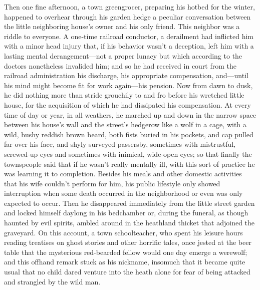 \documentclass[12pt,a4paper]{article}
\begin{document}
Then one fine afternoon, a town greengrocer, preparing his hotbed for the winter, happened to overhear through his garden hedge a peculiar conversation between the little neighboring house’s owner and his only friend. This neighbor was a riddle to everyone. A one-time railroad conductor, a derailment had inflicted him with a minor head injury that, if his behavior wasn’t a deception, left him with a lasting mental derangement—not a proper lunacy but which according to the doctors nonetheless invalided him; and so he had received in court from the railroad administration his discharge, his appropriate compensation, and—until his mind might become fit for work again—his pension. Now from dawn to dusk, he did nothing more than stride grouchily to and fro before his wretched little house, for the acquisition of which he had dissipated his compensation. At every time of day or year, in all weathers, he marched up and down in the narrow space between his house’s wall and the street’s hedgerow like a wolf in a cage, with a wild, bushy reddish brown beard, both fists buried in his pockets, and cap pulled far over his face, and shyly surveyed passersby, sometimes with mistrustful, screwed-up eyes and sometimes with inimical, wide-open eyes; so that finally the townspeople said that if he wasn’t really mentally ill, with this sort of practice he was learning it to completion. Besides his meals and other domestic activities that his wife couldn’t perform for him, his public lifestyle only showed interruption when some death occurred in the neighborhood or even was only expected to occur. Then he disappeared immediately from the little street garden and locked himself daylong in his bedchamber or, during the funeral, as though haunted by evil spirits, ambled around in the heathland thicket that adjoined the graveyard. On this account, a town schoolteacher, who spent his leisure hours reading treatises on ghost stories and other horrific tales, once jested at the beer table that the mysterious red-bearded fellow would one day emerge a werewolf; and this offhand remark stuck as his nickname, insomuch that it became quite usual that no child dared venture into the heath alone for fear of being attacked and strangled by the wild man.
\end{document}
